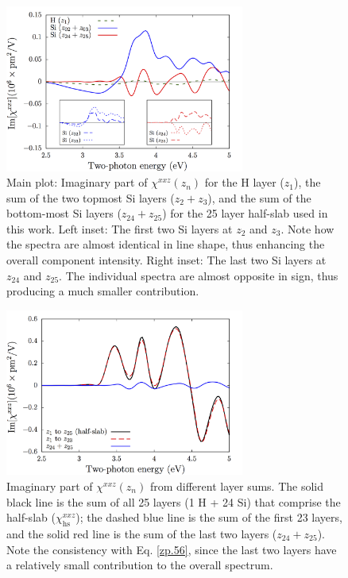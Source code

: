 \documentclass[utf8]{frontiersSCNS}
\begin{document}
\begin{figure}[b]
\centering 
\includegraphics[width=0.7\textwidth]{fig2}
\caption{Main plot: Imaginary part of $\chi^{xxz}(z_{n})$ for the H layer
($z_1$), the sum of the two topmost Si layers ($z_{2} + z_{3}$), and the sum of
the bottom-most Si layers ($z_{24 }+ z_{25}$) for the 25 layer half-slab used in
this work.
{\color{red}
Left inset:
The first two Si layers at $z_{2}$ and $z_{3}$. Note how the spectra are almost
identical in line shape, thus enhancing the overall component intensity.
Right inset:
The last two Si layers at $z_{24}$ and $z_{25}$. The individual spectra are
almost opposite in sign, thus producing a much smaller contribution.
}}
\label{fig:layers}
\end{figure}

\begin{figure}[b]
\centering 
\includegraphics[width=0.7\textwidth]{fig3}
\caption{
{\color{red}
Imaginary part of $\chi^{xxz}(z_{n})$ from different layer sums. The
solid black line is the sum of all 25 layers (1 H + 24 Si) that comprise the
half-slab ($\chi^{xxz}_{\mathrm{hs}}$); the dashed blue line is the sum of the
first 23 layers, and the solid red line is the sum of the last two layers
($z_{24 }+ z_{25}$). Note the consistency with Eq. \eqref{zp.56}, since the
last two layers have a relatively small contribution to the overall spectrum.
}}
\label{fig:sums}
\end{figure}
\end{document}
